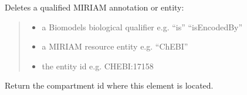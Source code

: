 \documentclass[letterpaper,12pt,english]{sphinxmanual}
\begin{document}
\begin{fulllineitems}
\begin{fulllineitems}
\end{fulllineitems}


\begin{fulllineitems}
\label{\detokenize{api/core:cbmpy.CBModel.Fbase.deleteMIRIAMannotation}}
\pysigstartsignatures
\pysiglinewithargsret
{}
{\sphinxparamcomma {}\sphinxparamcomma {}}
{}
\pysigstopsignatures
\sphinxAtStartPar
Deletes a qualified MIRIAM annotation or entity:
\begin{quote}\begin{description}
\begin{itemize}
\item {} 
\sphinxAtStartPar
{} \textendash{} a Biomodels biological qualifier e.g. “is” “isEncodedBy”

\item {} 
\sphinxAtStartPar
{} \textendash{} a MIRIAM resource entity e.g. “ChEBI”

\item {} 
\sphinxAtStartPar
{} \textendash{} the entity id e.g. CHEBI:17158

\end{itemize}

\end{description}\end{quote}

\end{fulllineitems}


\begin{fulllineitems}
\label{\detokenize{api/core:cbmpy.CBModel.Fbase.getCompartmentId}}
\pysigstartsignatures
\pysiglinewithargsret
{}
{}
{}
\pysigstopsignatures
\sphinxAtStartPar
Return the compartment id where this element is located.

\end{fulllineitems}



\end{fulllineitems}
\end{document}
